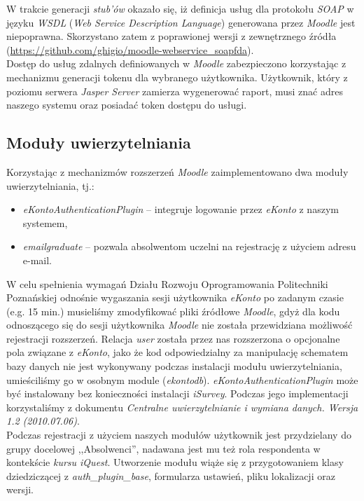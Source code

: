 W trakcie generacji \emph{stub'ów} okazało się, iż definicja usług dla protokołu \emph{SOAP} w języku \emph{WSDL} (\emph{Web Service Description Language}) generowana przez \emph{Moodle} jest niepoprawna. Skorzystano zatem z poprawionej wersji z zewnętrznego źródła (\url{https://github.com/ghigio/moodle-webservice_soapfda}).\\

Dostęp do usług zdalnych definiowanych w \emph{Moodle} zabezpieczono korzystając z mechanizmu generacji tokenu dla wybranego użytkownika. Użytkownik, który z poziomu serwera \emph{Jasper Server} zamierza wygenerować raport, musi znać adres naszego systemu oraz posiadać token dostępu do usługi.

\subsection{Moduły uwierzytelniania}
Korzystając z mechanizmów rozszerzeń \emph{Moodle} zaimplementowano dwa moduły uwierzytelniania, tj.:
\begin{itemize}
\item \emph{eKontoAuthenticationPlugin} -- integruje logowanie przez \emph{eKonto} z naszym systemem,
\item \emph{emailgraduate} -- pozwala absolwentom uczelni na rejestrację z użyciem adresu e-mail.
\end{itemize}

W celu spełnienia wymagań Działu Rozwoju Oprogramowania Politechniki Poznańskiej odnośnie wygaszania sesji użytkownika \emph{eKonto} po zadanym czasie (e.g. 15 min.) musieliśmy zmodyfikować pliki źródłowe \emph{Moodle}, gdyż dla kodu odnoszącego się do sesji użytkownika \emph{Moodle} nie została przewidziana możliwość rejestracji rozszerzeń. Relacja \emph{user} została przez nas rozszerzona o opcjonalne pola związane z \emph{eKonto}, jako że kod odpowiedzialny za manipulację schematem bazy danych nie jest wykonywany podczas instalacji modułu uwierzytelniania, umieściliśmy go w osobnym module (\emph{ekontodb}). \emph{eKontoAuthenticationPlugin} może być instalowany bez konieczności instalacji \emph{iSurvey}. Podczas jego implementacji korzystaliśmy z dokumentu \emph{Centralne uwierzytelnianie i wymiana danych. Wersja 1.2 (2010.07.06)}.\\

Podczas rejestracji z użyciem naszych modułów użytkownik jest przydzielany do grupy docelowej ,,Absolwenci'', nadawana jest mu też rola respondenta w kontekście \emph{kursu iQuest}. Utworzenie modułu wiąże się z przygotowaniem klasy dziedziczącej z \emph{auth\_plugin\_base}, formularza ustawień, pliku lokalizacji oraz wersji.

